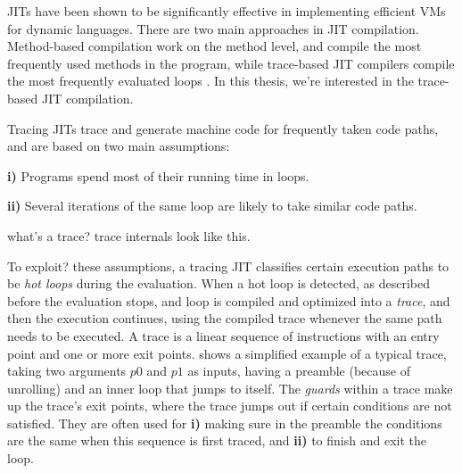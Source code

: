     \begin{paragraph-here}
            JITs have been shown to be significantly effective in implementing
            efficient VMs for dynamic languages. There are two main approaches in
            JIT compilation. Method-based compilation work on the method level,
            and compile the most frequently used methods in the program, while
            trace-based JIT compilers compile the most frequently evaluated loops
            \cite{survey:05,jit-history:03}. In this thesis, we're interested in
            the trace-based JIT compilation.

            Tracing JITs trace and generate machine code for frequently taken code paths, and are based on two main assumptions:

            \textbf{i)} Programs spend most of their running time in loops.

            \textbf{ii)} Several iterations of the same loop are likely to take
            similar code paths. \cite{pypy-main}
    \end{paragraph-here}

    \begin{paragraph-here}
        what's a trace? trace internals look like this.

        To exploit? these assumptions, a tracing JIT classifies certain
        execution paths to be \emph{hot loops} during the evaluation. When a
        hot loop is detected, as described before the evaluation stops, and
        loop is compiled and optimized into a \emph{trace}, and then the
        execution continues, using the compiled trace whenever the same path
        needs to be executed. A trace is a linear sequence of instructions
        with an entry point and one or more exit points. 
        shows a simplified example of a typical trace, taking two arguments
        $p0$ and $p1$ as inputs, having a preamble (because of unrolling) and
        an inner loop that jumps to itself. The \emph{guards} within a trace
        make up the trace's exit points, where the trace jumps out if certain
        conditions are not satisfied. They are often used for \textbf{i)}
        making sure in the preamble the conditions are the same when this
        sequence is first traced, and \textbf{ii)} to finish and exit the
        loop.
    \end{paragraph-here}



